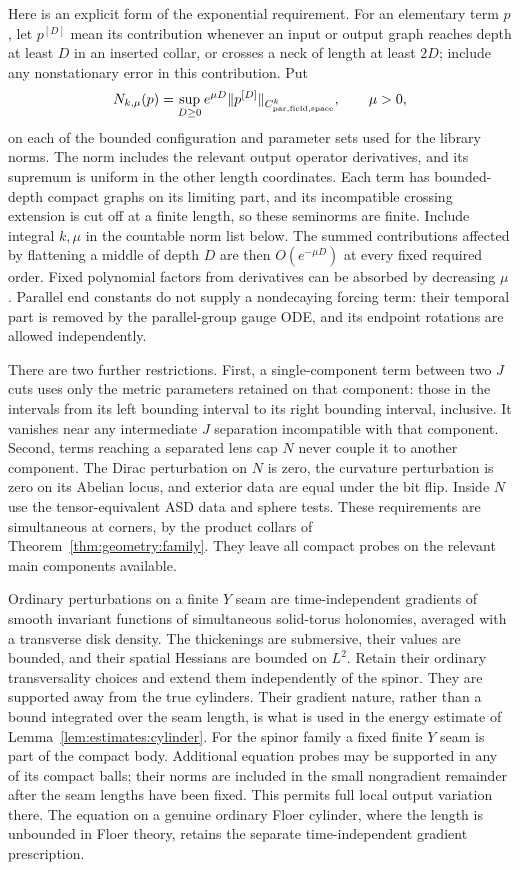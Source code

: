 Here is an explicit form of the exponential requirement.  For an
elementary term $p$, let $p^{[D]}$ mean its contribution whenever an
input or output graph reaches depth at least $D$ in an inserted
collar, or crosses a neck of length at least $2D$; include any
nonstationary error in this contribution.  Put
\begin{equation}\label{eq:analysis:exponential-seminorm}
 N_{k,\mu}(p)=\sup_{D\geq0}e^{\mu D}
       \|p^{[D]}\|_{C^k_{\rm par,field,space}},\qquad \mu>0,
\end{equation}
on each of the bounded configuration and parameter sets used for
the library norms.  The norm includes the relevant output operator
derivatives, and its supremum is uniform in the other length
coordinates.  Each term has bounded-depth compact graphs on its
limiting part, and its incompatible crossing extension is cut off
at a finite length, so these seminorms are finite.  Include integral
$k,\mu$ in the countable norm list below.  The summed contributions
affected by flattening a middle of depth $D$ are then
$O(e^{-\mu D})$ at every fixed required order.  Fixed polynomial
factors from derivatives can be absorbed by decreasing $\mu$.
Parallel end constants do not supply a nondecaying forcing term:
their temporal part is removed by the parallel-group gauge ODE,
and its endpoint rotations are allowed independently.

There are two further restrictions.  First, a single-component term
between two $J$ cuts uses only the metric parameters retained on that
component: those in the intervals from its left bounding interval to its
right bounding interval, inclusive.  It vanishes near any intermediate
$J$ separation incompatible with that component.  Second, terms reaching
a separated lens cap $N$ never couple it to another component.  The
Dirac perturbation on $N$ is zero, the curvature perturbation is zero on
its Abelian locus, and exterior data are equal under the bit flip.
Inside $N$ use the tensor-equivalent ASD data and sphere tests.  These
requirements are simultaneous at corners, by the product collars of
Theorem~\ref{thm:geometry:family}.  They leave all compact probes on the
relevant main components available.

Ordinary perturbations on a finite $Y$ seam are time-independent gradients
of smooth invariant functions of simultaneous solid-torus holonomies,
averaged with a transverse disk density.  The thickenings are submersive,
their values are bounded, and their spatial Hessians are bounded on
$L^2$.  Retain their ordinary transversality choices and extend them
independently of the spinor.  They are supported away from the true
cylinders.  Their gradient nature, rather than a bound integrated over
the seam length, is what is used in the energy estimate of
Lemma~\ref{lem:estimates:cylinder}.
For the spinor family a fixed finite $Y$ seam is part of the compact
body.  Additional equation probes may be supported in any of its
compact balls; their norms are included in the small nongradient
remainder after the seam lengths have been fixed.  This permits full
local output variation there.  The equation on a genuine ordinary
Floer cylinder, where the length is unbounded in Floer theory, retains
the separate time-independent gradient prescription.

